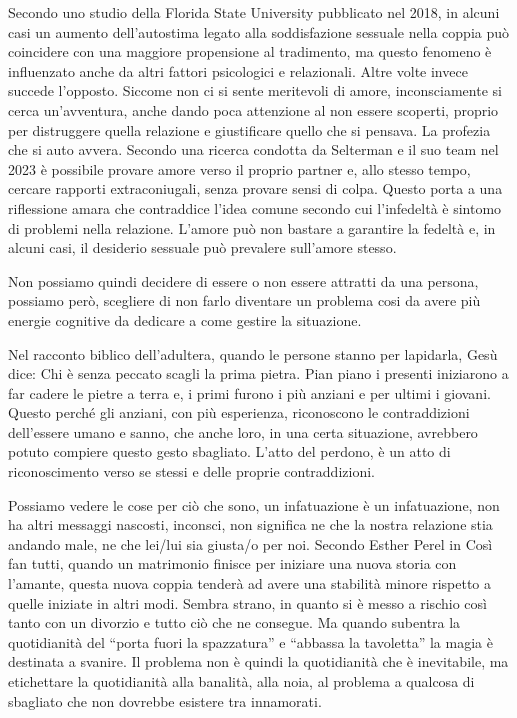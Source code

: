 \documentclass[12pt]{book} %
\begin{document}
Secondo uno studio della Florida State University pubblicato nel 2018, in alcuni casi un aumento dell'autostima legato alla soddisfazione sessuale nella coppia può coincidere con una maggiore propensione al tradimento, ma questo fenomeno è influenzato anche da altri fattori psicologici e relazionali. Altre volte invece succede l'opposto. Siccome non ci si sente meritevoli di amore,
inconsciamente si cerca un'avventura, anche dando poca attenzione al non essere scoperti, proprio
per distruggere quella relazione e giustificare quello che si pensava. La profezia che si auto avvera.
Secondo una ricerca condotta da Selterman e il suo team nel 2023 è possibile provare amore verso il proprio partner e, allo stesso tempo, cercare rapporti extraconiugali, senza provare sensi di colpa. Questo porta a una riflessione amara che contraddice l'idea comune secondo cui l'infedeltà è sintomo di problemi nella relazione. L'amore può non bastare a garantire la fedeltà e, in alcuni casi, il desiderio sessuale può prevalere sull'amore stesso.

Non possiamo quindi decidere di essere o non essere attratti da una persona, possiamo però, scegliere di non farlo
diventare un problema cosi da avere più energie cognitive da dedicare a come gestire la situazione.

Nel racconto biblico dell'adultera, quando le persone stanno per lapidarla, Gesù dice: Chi è senza peccato scagli la
prima pietra. Pian piano i presenti iniziarono a far cadere le pietre a terra e, i primi furono i più anziani e per
ultimi i giovani. Questo perché gli anziani, con più esperienza, riconoscono le contraddizioni
dell'essere umano e sanno, che anche loro, in una certa situazione, avrebbero potuto compiere
questo gesto sbagliato. L'atto del perdono, è un atto di riconoscimento verso se stessi e delle proprie contraddizioni.

Possiamo vedere le cose per ciò che sono, un infatuazione è
un infatuazione, non ha altri messaggi nascosti, inconsci, non significa ne che la nostra relazione stia andando male,
ne che lei/lui sia giusta/o per noi. Secondo Esther Perel in Così fan
tutti, quando un matrimonio finisce per iniziare una nuova storia con
l'amante, questa nuova coppia tenderà ad avere una stabilità minore rispetto a quelle iniziate in altri modi. Sembra strano, in
quanto si è messo a rischio così tanto con un divorzio e tutto ciò che ne consegue. Ma quando subentra la quotidianità
del “porta fuori la spazzatura” e “abbassa la tavoletta” la magia è destinata a svanire. Il problema non è quindi la
quotidianità che è inevitabile, ma etichettare la quotidianità alla banalità, alla noia, al problema a qualcosa di sbagliato che non dovrebbe esistere tra innamorati.
\end{document}
